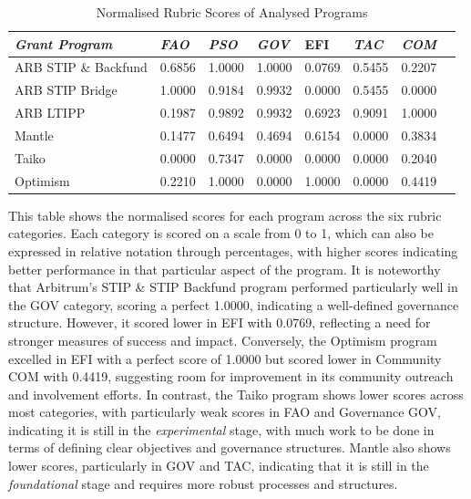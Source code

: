 \documentclass[conference]{IEEEtran}
\begin{document}
\begin{table}[htbp]
\caption{Normalised Rubric Scores of Analysed Programs}
\begin{center}
\footnotesize
\begin{tabular}{p{2.9cm}p{0.5cm}p{0.5cm}p{0.5cm}p{0.5cm}p{0.5cm}p{0.5cm}p{0.5cm}}
\hline
\textbf{\textit{Grant Program}} & \textbf{\textit{FAO}} & \textbf{\textit{PSO}} & \textbf{\textit{GOV}} & \textbf{EFI} & \textbf{\textit{TAC}} & \textbf{\textit{COM}} \\
\hline
ARB STIP \& Backfund & 0.6856 & 1.0000 & 1.0000 & 0.0769 & 0.5455 & 0.2207 \\
ARB STIP Bridge & 1.0000 & 0.9184 & 0.9932 & 0.0000 & 0.5455 & 0.0000 \\
ARB LTIPP & 0.1987 & 0.9892 & 0.9932 & 0.6923 & 0.9091 & 1.0000 \\
Mantle & 0.1477 & 0.6494 & 0.4694 & 0.6154 & 0.0000 & 0.3834 \\
Taiko & 0.0000 & 0.7347 & 0.0000 & 0.0000 & 0.0000 & 0.2040 \\
Optimism & 0.2210 & 1.0000 & 0.0000 & 1.0000 & 0.0000 & 0.4419 \\
\hline
\end{tabular}
\end{center}
\label{tab:rubric_scores}
\end{table}

This table shows the normalised scores for each program across the six rubric categories. Each category is scored on a scale from 0 to 1, which can also be expressed in relative notation through percentages, with higher scores indicating better performance in that particular aspect of the program. It is noteworthy that Arbitrum's STIP \& STIP Backfund program performed particularly well in the GOV category, scoring a perfect 1.0000, indicating a well-defined governance structure. However, it scored lower in EFI with 0.0769, reflecting a need for stronger measures of success and impact. Conversely, the Optimism program excelled in EFI with a perfect score of 1.0000 but scored lower in Community COM with 0.4419, suggesting room for improvement in its community outreach and involvement efforts. In contrast, the Taiko program shows lower scores across most categories, with particularly weak scores in FAO and Governance GOV, indicating it is still in the \textit{experimental} stage, with much work to be done in terms of defining clear objectives and governance structures. Mantle also shows lower scores, particularly in GOV and TAC, indicating that it is still in the \textit{foundational} stage and requires more robust processes and structures.
\end{document}
